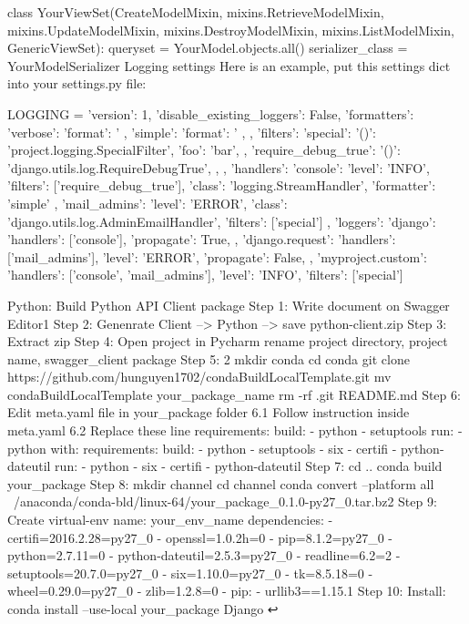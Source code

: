 class YourViewSet(CreateModelMixin,
                  mixins.RetrieveModelMixin,
                  mixins.UpdateModelMixin,
                  mixins.DestroyModelMixin,
                  mixins.ListModelMixin,
                  GenericViewSet):
    queryset = YourModel.objects.all()
    serializer_class = YourModelSerializer
Logging settings
Here is an example, put this settings dict into your settings.py file:


LOGGING = {
    'version': 1,
    'disable_existing_loggers': False,
    'formatters': {
        'verbose': {
            'format': '%
        },
        'simple': {
            'format': '%
        },
    },
    'filters': {
        'special': {
            '()': 'project.logging.SpecialFilter',
            'foo': 'bar',
        },
        'require_debug_true': {
            '()': 'django.utils.log.RequireDebugTrue',
        },
    },
    'handlers': {
        'console': {
            'level': 'INFO',
            'filters': ['require_debug_true'],
            'class': 'logging.StreamHandler',
            'formatter': 'simple'
        },
        'mail_admins': {
            'level': 'ERROR',
            'class': 'django.utils.log.AdminEmailHandler',
            'filters': ['special']
        }
    },
    'loggers': {
        'django': {
            'handlers': ['console'],
            'propagate': True,
        },
        'django.request': {
            'handlers': ['mail_admins'],
            'level': 'ERROR',
            'propagate': False,
        },
        'myproject.custom': {
            'handlers': ['console', 'mail_admins'],
            'level': 'INFO',
            'filters': ['special']
        }
    }
}

Python: Build Python API Client package
Step 1: Write document on Swagger Editor1
Step 2: Genenrate Client --> Python --> save python-client.zip
Step 3: Extract zip
Step 4: Open project in Pycharm rename project directory, project name, swagger_client package
Step 5: 2
mkdir conda
cd conda
git clone https://github.com/hunguyen1702/condaBuildLocalTemplate.git
mv condaBuildLocalTemplate your_package_name
rm -rf .git README.md
Step 6: Edit meta.yaml file in your_package folder
6.1 Follow instruction inside meta.yaml
6.2 Replace these line
requirements:
  build:
    - python
    - setuptools
  run:
    - python
with:
requirements:
  build:
    - python
    - setuptools
    - six
    - certifi
    - python-dateutil
  run:
    - python
    - six
    - certifi
    - python-dateutil
Step 7:
cd ..
conda build your_package
Step 8:
mkdir channel
cd channel
conda convert --platform all ~/anaconda/conda-bld/linux-64/your_package_0.1.0-py27_0.tar.bz2
Step 9: Create virtual-env
name: your_env_name
dependencies:
- certifi=2016.2.28=py27_0
- openssl=1.0.2h=0
- pip=8.1.2=py27_0
- python=2.7.11=0
- python-dateutil=2.5.3=py27_0
- readline=6.2=2
- setuptools=20.7.0=py27_0
- six=1.10.0=py27_0
- tk=8.5.18=0
- wheel=0.29.0=py27_0
- zlib=1.2.8=0
- pip:
  - urllib3==1.15.1
Step 10: Install:
conda install --use-local your_package
Django ↩

